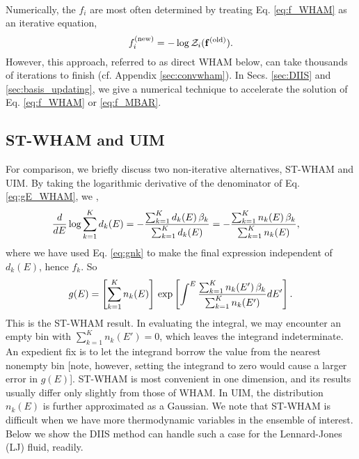 \documentclass[reprint,aip,jcp,superscriptaddress]{revtex4-1}
\begin{document}
\paragraph*{}



Numerically, the
$f_i$ are most often determined by treating Eq. \eqref{eq:f_WHAM}
as an iterative equation,
%
\begin{equation*}
f_i^\mathrm{(new)}
=
-\log \mathcal{Z}_i( \mathbf{f}^\mathrm{(old)} ).
\end{equation*}
%
However, this approach, referred to as direct WHAM below,
can take thousands of iterations to finish\cite{
bereau2009, kim2011, zhu2012}
(cf. Appendix \ref{sec:convwham}).
%
In Secs. \ref{sec:DIIS} and \ref{sec:basis_updating},
we give a numerical technique to
accelerate the solution
of Eq. \eqref{eq:f_WHAM} or \eqref{eq:f_MBAR}.





\subsection{ST-WHAM and UIM}



For comparison,
we briefly discuss
two non-iterative alternatives, ST-WHAM\cite{
fenwick2008, kim2011}
and UIM\cite{
kastner2005, *kastner2009}.
%
By taking the logarithmic derivative of
the denominator of Eq. \eqref{eq:gE_WHAM},
we ,
%
\begin{align}
\frac{d}{dE}
\log
  \sum_{k = 1}^K d_k(E)
&=
-
\frac{
  \sum_{k = 1}^K d_k(E) \, \beta_k
}
{
  \sum_{k = 1}^K d_k(E)
}
=
-
\frac{
  \sum_{k = 1}^K n_k(E) \, \beta_k
}
{
  \sum_{k = 1}^K n_k(E)
},
\notag
\end{align}
%
{
where
we have used Eq. \eqref{eq:gnk}
to make the final expression
independent of $d_k(E)$, hence $f_k$.
}
%
So
\begin{align}
g(E)
=
\left[
  \sum_{k = 1}^K n_k(E)
\right]
\,
\exp
\left[
\int^E
    \frac{ \sum_{k = 1}^K n_k(E') \, \beta_k }
         { \sum_{k = 1}^K n_k(E') }
  dE'
\right].
\notag
\end{align}
%
This is the ST-WHAM result.
%
In evaluating the integral,
we may encounter an empty bin
with $\sum_{k = 1}^K n_k(E') = 0$,
which leaves the integrand indeterminate.
%
An expedient fix is to let the integrand borrow
the value from the nearest nonempty bin
%
[note, however, setting the integrand to zero
would cause a larger error in $g(E)$].
%
ST-WHAM is most convenient in one dimension,
and its results usually differ only slightly
from those of WHAM\cite{kim2011}.
%
In UIM\cite{
kastner2005, *kastner2009},
the distribution $n_k(E)$
is further approximated as a Gaussian.
%
We note that ST-WHAM is difficult when we have more
thermodynamic variables in the ensemble of interest.
%
Below we show  the DIIS method can
handle such a case
for the Lennard-Jones (LJ) fluid, readily.
\end{document}
